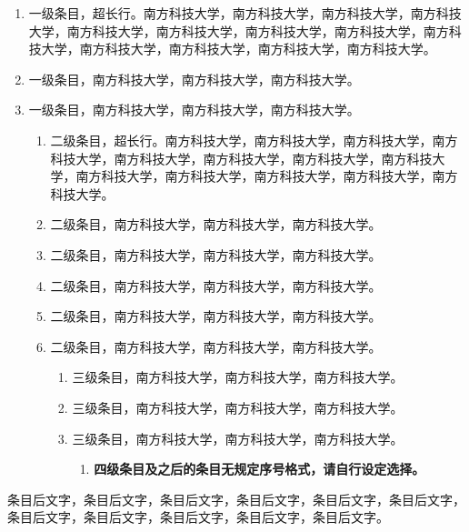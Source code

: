 \begin{enumerate}
  \item 一级条目，超长行。南方科技大学，南方科技大学，南方科技大学，南方科技大学，南方科技大学，南方科技大学，南方科技大学，南方科技大学，南方科技大学，南方科技大学，南方科技大学，南方科技大学，南方科技大学。
  \item 一级条目，南方科技大学，南方科技大学，南方科技大学。
  \item 一级条目，南方科技大学，南方科技大学，南方科技大学。
  \begin{enumerate}
    \item 二级条目，超长行。南方科技大学，南方科技大学，南方科技大学，南方科技大学，南方科技大学，南方科技大学，南方科技大学，南方科技大学，南方科技大学，南方科技大学，南方科技大学，南方科技大学，南方科技大学。
    \item 二级条目，南方科技大学，南方科技大学，南方科技大学。
    \item 二级条目，南方科技大学，南方科技大学，南方科技大学。
    \item 二级条目，南方科技大学，南方科技大学，南方科技大学。
    \item 二级条目，南方科技大学，南方科技大学，南方科技大学。
    \item 二级条目，南方科技大学，南方科技大学，南方科技大学。
    \begin{enumerate}
      \item 三级条目，南方科技大学，南方科技大学，南方科技大学。
      \item 三级条目，南方科技大学，南方科技大学，南方科技大学。
      \item 三级条目，南方科技大学，南方科技大学，南方科技大学。
      \begin{enumerate}
        \item \textbf{四级条目及之后的条目无规定序号格式，请自行设定选择。}
      \end{enumerate}
    \end{enumerate}
  \end{enumerate}
\end{enumerate}

条目后文字，条目后文字，条目后文字，条目后文字，条目后文字，条目后文字，条目后文字，条目后文字，条目后文字，条目后文字，条目后文字。
